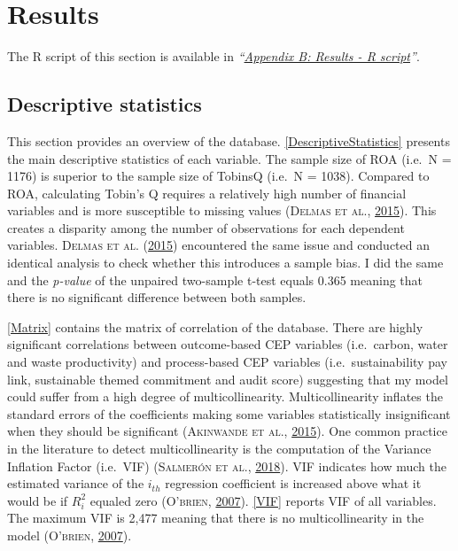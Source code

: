 \documentclass[12pt,]{article}
\begin{document}
\FloatBarrier
\newpage
{}

\hypertarget{results}{\section{Results}\label{results}}

The R script of this section is available in
\emph{``\protect\hyperlink{appendix-b-results---r-script}{Appendix B:
Results - R script}''}.

\subsection{Descriptive statistics}\label{descriptive-statistics}

This section provides an overview of the database.
\autoref{DescriptiveStatistics} presents the main descriptive statistics
of each variable. The sample size of ROA (i.e.~N = 1176) is superior to
the sample size of TobinsQ (i.e.~N = 1038). Compared to ROA, calculating
Tobin's Q requires a relatively high number of financial variables and
is more susceptible to missing values (\textsc{Delmas et al.},
\protect\hyperlink{ref-Delmas2015}{2015}). This creates a disparity
among the number of observations for each dependent variables.
\textsc{Delmas et al.} (\protect\hyperlink{ref-Delmas2015}{2015})
encountered the same issue and conducted an identical analysis to check
whether this introduces a sample bias. I did the same and the
\emph{p-value} of the unpaired two-sample t-test equals 0.365 meaning
that there is no significant difference between both samples.

\autoref{Matrix} contains the matrix of correlation of the database.
There are highly significant correlations between outcome-based CEP
variables (i.e.~carbon, water and waste productivity) and process-based
CEP variables (i.e.~sustainability pay link, sustainable themed
commitment and audit score) suggesting that my model could suffer from a
high degree of multicollinearity. Multicollinearity inflates the
standard errors of the coefficients making some variables statistically
insignificant when they should be significant (\textsc{Akinwande et
al.}, \protect\hyperlink{ref-Akinwande2015}{2015}). One common practice
in the literature to detect multicollinearity is the computation of the
Variance Inflation Factor (i.e.~VIF) (\textsc{Salmerón et al.},
\protect\hyperlink{ref-Salmeron2018}{2018}). VIF indicates how much the
estimated variance of the \(i_{th}\) regression coefficient is increased
above what it would be if \(R_i^2\) equaled zero (\textsc{O'brien},
\protect\hyperlink{ref-Obrien2007}{2007}). \autoref{VIF} reports VIF of
all variables. The maximum VIF is 2,477 meaning that there is no
multicollinearity in the model (\textsc{O'brien},
\protect\hyperlink{ref-Obrien2007}{2007}).
\end{document}
